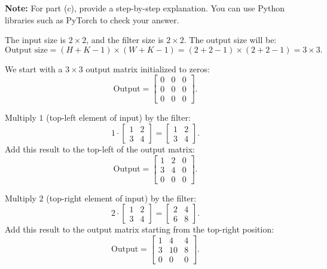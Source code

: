 \textbf{Note:} For part (c), provide a step-by-step explanation. You can use Python libraries such as PyTorch to check your answer.
    \begin{qsolve}
      \begin{qsolve}[]
        The input size is \( 2 \times 2 \), and the filter size is \( 2 \times 2 \). The output size will be:
      \[
      \text{Output size} = (H + K - 1) \times (W + K - 1) = (2 + 2 - 1) \times (2 + 2 - 1) = 3 \times 3.
      \]

      We start with a \( 3 \times 3 \) output matrix initialized to zeros:
      \[
      \text{Output} = 
      \begin{bmatrix}
      0 & 0 & 0 \\
      0 & 0 & 0 \\
      0 & 0 & 0
      \end{bmatrix}.
      \]


      Multiply \( 1 \) (top-left element of input) by the filter:
      \[
      1 \cdot
      \begin{bmatrix}
      1 & 2 \\
      3 & 4
      \end{bmatrix}
      =
      \begin{bmatrix}
      1 & 2 \\
      3 & 4
      \end{bmatrix}.
      \]
      Add this result to the top-left of the output matrix:
      \[
      \text{Output} =
      \begin{bmatrix}
      1 & 2 & 0 \\
      3 & 4 & 0 \\
      0 & 0 & 0
      \end{bmatrix}.
      \]


      Multiply \( 2 \) (top-right element of input) by the filter:
      \[
      2 \cdot
      \begin{bmatrix}
      1 & 2 \\
      3 & 4
      \end{bmatrix}
      =
      \begin{bmatrix}
      2 & 4 \\
      6 & 8
      \end{bmatrix}.
      \]
      Add this result to the output matrix starting from the top-right position:
      \[
      \text{Output} =
      \begin{bmatrix}
      1 & 4 & 4 \\
      3 & 10 & 8 \\
      0 & 0 & 0
      \end{bmatrix}.
      \]



\end{qsolve}
\end{qsolve}
